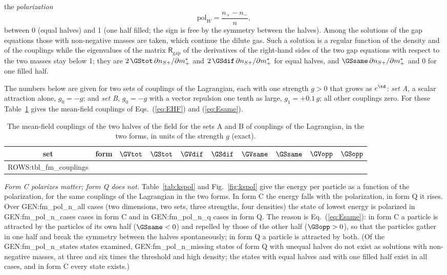 the \emph{polarization}
\begin{equation}
\mathrm{pol}_W=\frac{n_+-n_-}{n},
\label{eq:pol}
\end{equation}
between 0 (equal halves) and 1 (one half filled; the sign is free by the symmetry between the
halves). Among the solutions of the gap equations those with non-negative masses are taken, which
continue the dilute gas. Such a solution is a regular function of the density and of the couplings
while the eigenvalues of the matrix $\mathsf R_{\mathrm{gap}}$ of the derivatives of the right-hand
sides of the two gap equations with respect to the two masses stay below 1; they are
$2\,\GStot\,\partial n_{S+}/\partial m^{*}_+$ and $2\,\GSdif\,\partial n_{S+}/\partial m^{*}_+$ for equal
halves, and $\GSsame\,\partial n_{S+}/\partial m^{*}_+$ and 0 for one filled half.

The numbers below are given for two sets of couplings of the Lagrangian, each with one strength
$g>0$ that grows as $e^{\td}$: \emph{set A}, a scalar attraction alone, $g_0=-g$; and \emph{set B},
$g_0=-g$ with a vector repulsion one tenth as large, $g_1=+0.1\,g$; all other couplings zero. For
these Table~\ref{tab:kscoup} gives the mean-field couplings of Eqs.~(\ref{eq:EHF}) and
(\ref{eq:Esame}).

\begin{table}
\caption{\label{tab:kscoup}The mean-field couplings of the two halves of the field for the sets A
and B of couplings of the Lagrangian, in the two forms, in units of the strength $g$ (exact).}
\begin{ruledtabular}
\begin{tabular}{cccccccccc}
set & form & $\GVtot$ & $\GStot$ & $\GVdif$ & $\GSdif$ & $\GVsame$ & $\GSsame$ & $\GVopp$ & $\GSopp$ \\
\hline
{{ROWS:tbl_fm_couplings}}
\end{tabular}
\end{ruledtabular}
\end{table}

\emph{Form C polarizes matter; form Q does not.} Table~\ref{tab:kspol} and Fig.~\ref{fig:kspol} give
the energy per particle as a function of the polarization, for the same couplings of the Lagrangian
in the two forms. In form C the energy falls with the polarization, in form Q it rises. Over
{{GEN:fm_pol_n_all}} cases (two dimensions, two sets, three strengths, four densities) the state of
lowest energy is polarized in {{GEN:fm_pol_n_cases}} cases in form C and in {{GEN:fm_pol_n_q}} cases
in form Q. The reason is Eq.~(\ref{eq:Esame}): in form C a particle is attracted by the particles of
its own half ($\GSsame<0$) and repelled by those of the other half ($\GSopp>0$), so that the
particles gather in one half and break the symmetry between the halves spontaneously; in form Q a
particle is attracted by both. (Of the {{GEN:fm_pol_n_states}} states examined,
{{GEN:fm_pol_n_missing}} states of form Q with unequal halves do not exist as solutions with
non-negative masses, at three and six times the threshold and high density; the states with equal
halves and with one filled half exist in all cases, and in form C every state exists.)

